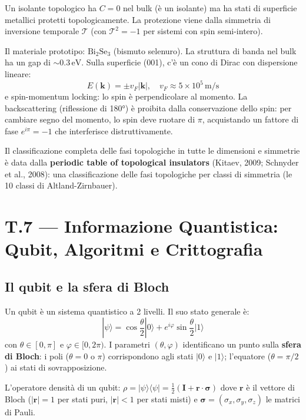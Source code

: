 \documentclass[11.5pt,a4paper,openany]{book}
\theoremstyle{remark}
\begin{document}
Un isolante topologico ha $C = 0$ nel bulk (è un isolante) ma ha stati di superficie metallici protetti topologicamente. La protezione viene dalla simmetria di inversione temporale $\mathcal{T}$ (con $\mathcal{T}^2 = -1$ per sistemi con spin semi-intero).

Il materiale prototipo: $\mathrm{Bi}_2\mathrm{Se}_3$ (bismuto selenuro). La struttura di banda nel bulk ha un gap di $\sim 0.3\,\mathrm{eV}$. Sulla superficie (001), c'è un cono di Dirac con dispersione lineare:
\[
E(\mathbf{k}) = \pm v_F|\mathbf{k}|, \quad v_F \approx 5 \times 10^5\,\mathrm{m/s}
\]
e spin-momentum locking: lo spin è perpendicolare al momento. La backscattering (riflessione di 180°) è proibita dalla conservazione dello spin: per cambiare segno del momento, lo spin deve ruotare di $\pi$, acquistando un fattore di fase $e^{i\pi} = -1$ che interferisce distruttivamente.

Il classificazione completa delle fasi topologiche in tutte le dimensioni e simmetrie è data dalla \textbf{periodic table of topological insulators} (Kitaev, 2009; Schnyder et al., 2008): una classificazione delle fasi topologiche per classi di simmetria (le 10 classi di Altland-Zirnbauer).

\chapter*{T.7 — Informazione Quantistica: Qubit, Algoritmi e Crittografia}

\section{Il qubit e la sfera di Bloch}

Un qubit è un sistema quantistico a 2 livelli. Il suo stato generale è:
\[
|\psi\rangle = \cos\frac{\theta}{2}|0\rangle + e^{i\varphi}\sin\frac{\theta}{2}|1\rangle
\]
con $\theta \in [0, \pi]$ e $\varphi \in [0, 2\pi)$. I parametri $(\theta, \varphi)$ identificano un punto sulla \textbf{sfera di Bloch}: i poli ($\theta = 0$ o $\pi$) corrispondono agli stati $|0\rangle$ e $|1\rangle$; l'equatore ($\theta = \pi/2$) ai stati di sovrapposizione.

L'operatore densità di un qubit: $\rho = |\psi\rangle\langle\psi| = \frac{1}{2}(\mathbf{I} + \mathbf{r}\cdot\boldsymbol{\sigma})$ dove $\mathbf{r}$ è il vettore di Bloch ($|\mathbf{r}| = 1$ per stati puri, $|\mathbf{r}| < 1$ per stati misti) e $\boldsymbol{\sigma} = (\sigma_x, \sigma_y, \sigma_z)$ le matrici di Pauli.
\end{document}
